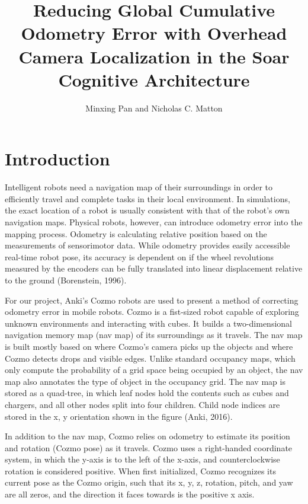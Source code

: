 \documentclass[jou,apacite]{apa6}
\title{Reducing Global Cumulative Odometry Error with Overhead Camera Localization in the Soar Cognitive Architecture}
\author{Minxing Pan and Nicholas C. Matton}
\affiliation{The University of Michigan}
\begin{document}
\maketitle

\section{Introduction}
Intelligent robots need a navigation map of their surroundings in order to efficiently travel and complete tasks in their local environment. In simulations, the exact location of a robot is usually consistent with that of the robot’s own navigation maps. Physical robots, however, can introduce odometry error into the mapping process. Odometry is calculating relative position based on the measurements of sensorimotor data. While odometry provides easily accessible real-time robot pose, its accuracy is dependent on if the wheel revolutions measured by the encoders can be fully translated into linear displacement relative to the ground (Borenstein, 1996).

For our project, Anki’s Cozmo robots are used to present a method of correcting odometry error in mobile robots. Cozmo is a fist-sized robot capable of exploring unknown environments and interacting with cubes. It builds a two-dimensional navigation memory map (nav map) of its surroundings as it travels. The nav map is built mostly based on where Cozmo’s camera picks up the objects and where Cozmo detects drops and visible edges. Unlike standard occupancy maps, which only compute the probability of a grid space being occupied by an object, the nav map also annotates the type of object in the occupancy grid. The nav map is stored as a quad-tree, in which leaf nodes hold the contents such as cubes and chargers, and all other nodes split into four children. Child node indices are stored in the x, y orientation shown in the figure (Anki, 2016).

In addition to the nav map, Cozmo relies on odometry to estimate its position and rotation (Cozmo pose) as it travels. Cozmo uses a right-handed coordinate system, in which the y-axis is to the left of the x-axis, and counterclockwise rotation is considered positive. When first initialized, Cozmo recognizes its current pose as the Cozmo origin, such that its x, y, z, rotation, pitch, and yaw are all zeros, and the direction it faces towards is the positive x axis. 
\end{document}
